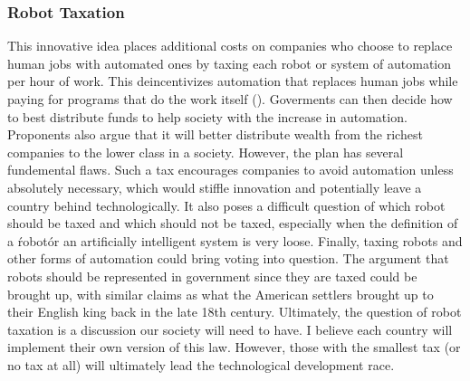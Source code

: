 \subsubsection{Robot Taxation} 
This innovative idea places additional costs on companies who choose to replace human jobs with automated ones by taxing each robot or system of automation per hour of work. This deincentivizes automation that replaces human jobs while paying for programs that do the work itself (\cite{abbottShouldRobotsPayTaxes}). Goverments can then decide how to best distribute funds to help society with the increase in automation. Proponents also argue that it will better distribute wealth from the richest companies to the lower class in a society. However, the plan has several fundemental flaws. Such a tax encourages companies to avoid automation unless absolutely necessary, which would stiffle innovation and potentially leave a country behind technologically. It also poses a difficult question of which robot should be taxed and which should not be taxed, especially when the definition of a \'robot\' or an artificially intelligent system is very loose. Finally, taxing robots and other forms of automation could bring voting into question. The argument that robots should be represented in government since they are taxed could be brought up, with similar claims as what the American settlers brought up to their English king back in the late 18th century. Ultimately, the question of robot taxation is a discussion our society will need to have. I believe each country will implement their own version of this law. However, those with the smallest tax (or no tax at all) will ultimately lead the technological development race.

